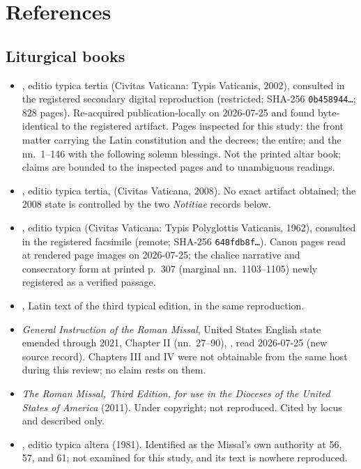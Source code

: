 \section{References}

\begingroup
\setlength{\parskip}{0pt}
\titlespacing*{\subsection}{0pt}{1.0ex}{0.3ex}

\subsection*{Liturgical books}

{\fontsize{8.6}{9.6}\selectfont
\begin{itemize}[itemsep=0pt,parsep=0pt,topsep=0.05em]
\item {}, editio typica tertia (Civitas Vaticana: Typis Vaticanis, 2002),
consulted in the registered secondary digital reproduction (restricted; SHA-256
\texttt{0b458944\ldots}; 828 pages). Re-acquired publication-locally on 2026-07-25 and found
byte-identical to the registered artifact. Pages inspected for this study: the front matter
carrying the Latin constitution  and the decrees; the  entire; and the  nn.\ 1--146 with the following solemn blessings.
Not the printed altar book; claims are bounded to the inspected pages and to unambiguous
readings.
\item {}, editio typica tertia,  (Civitas
Vaticana, 2008). No exact artifact obtained; the 2008 state is controlled by the two \emph{Notitiae}
records below.
\item {}, editio typica (Civitas Vaticana: Typis Polyglottis Vaticanis,
1962), consulted in the registered facsimile (remote; SHA-256 \texttt{648fdb8f\ldots}). Canon
pages read at rendered page images on 2026-07-25; the chalice narrative and consecratory form at
printed p.\ 307 (marginal nn.\ 1103--1105) newly registered as a verified passage.
\item {}, Latin text of the third typical edition, in
the same reproduction.
\item \emph{General Instruction of the Roman Missal}, United States English state emended
through 2021, Chapter II (nn.\ 27--90),
,
read 2026-07-25 (new source record). Chapters III and IV were not obtainable from the same host
during this review; no claim rests on them.
\item \emph{The Roman Missal, Third Edition, for use in the Dioceses of the United States of
America} (2011). Under copyright; not reproduced. Cited by locus and described only.
\item {}, editio typica altera (1981). Identified as the Missal's own
authority at  56, 57, and 61; not examined for this study, and its text is nowhere
reproduced.
\end{itemize}}

